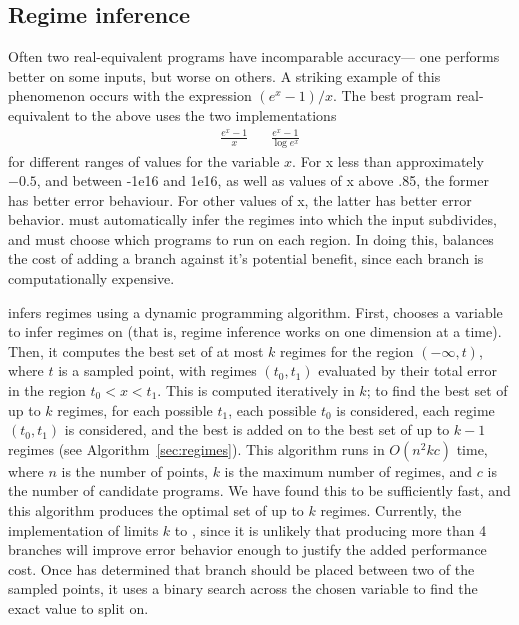 \documentclass[paper.tex]{subfiles}
\begin{document}
\subsection{Regime inference}

Often two real-equivalent programs have incomparable accuracy---%
  one performs better on some inputs, but worse on others.
A striking example of this phenomenon occurs with the expression $(e^x - 1) / x$.
The best program real-equivalent to the above
  uses the two implementations
\begin{align*}
  \frac{e^x - 1}{x} && \frac{e^x - 1}{\log e^x}
\end{align*}
  for different ranges of values for the variable $x$.
For x less than approximately $-0.5$, 
  and between -1e16 and 1e16,
  as well as values of x above .85,
  the former has better error behaviour.
For other values of x,
  the latter has better error behavior.
\casio must automatically infer the regimes
  into which the input subdivides,
  and must choose which programs to run on each region.
In doing this, \casio balances the cost of adding a branch
  against it's potential benefit,
  since each branch is computationally expensive.

\casio infers regimes using a dynamic programming algorithm.
First, \casio chooses a variable to infer regimes on
  (that is, regime inference works on one dimension at a time).
Then, it computes the best set of at most $k$ regimes
  for the region $(-\infty, t)$, where $t$ is a sampled point,
  with regimes $(t_0, t_1)$ evaluated by their total error
  in the region $t_0 < x < t_1$.
This is computed iteratively in $k$;
  to find the best set of up to $k$ regimes,
  for each possible $t_1$, each possible $t_0$ is considered,
  each regime $(t_0, t_1)$ is considered,
  and the best is added on to the best set of up to $k-1$ regimes
  (see Algorithm~\ref{sec:regimes}).
This algorithm runs in $O(n^2 k c)$ time,
  where $n$ is the number of points,
  $k$ is the maximum number of regimes,
  and $c$ is the number of candidate programs.
We have found this to be sufficiently fast,
  and this algorithm produces the optimal set of up to $k$ regimes.
Currently, the implementation of \casio limits $k$ to \nRegimes,
  since it is unlikely that producing more than 4 branches
  will improve error behavior enough to justify the added performance cost.
Once \casio has determined that branch should be placed
  between two of the sampled points,
  it uses a binary search across the chosen variable to 
  find the exact value to split on.
\end{document}
